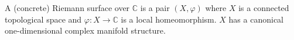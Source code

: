 A (concrete) Riemann surface over $\mathbb{C}$ is a pair $(X, \varphi)$ where $X$ is a connected topological space and $\varphi: X \to \mathbb{C}$ is a local homeomorphism. $X$ has a canonical one-dimensional complex manifold structure.
